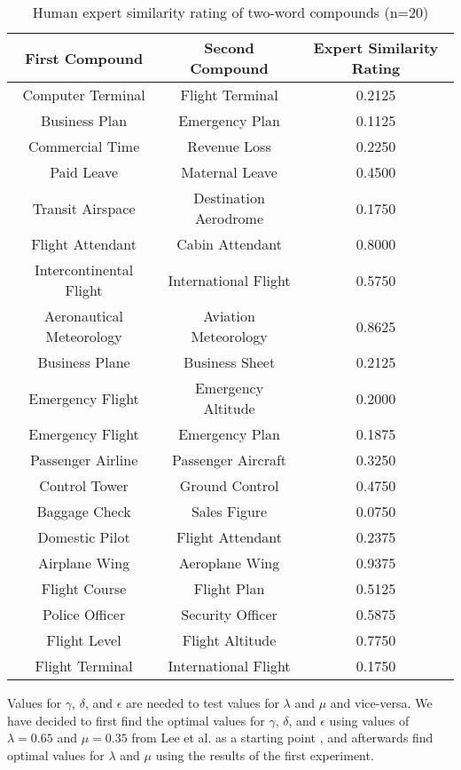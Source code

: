 \documentclass{article}
\begin{document}
\begin{table}[h!]
\centering
\begin{tabular}{|c|c||c|}
	\hline
	First Compound & Second Compound & Expert Similarity Rating \\
	\hline
	Computer Terminal & Flight Terminal & 0.2125 \\
	Business Plan & Emergency Plan & 0.1125 \\
	Commercial Time & Revenue Loss & 0.2250 \\
	Paid Leave & Maternal Leave & 0.4500 \\
	Transit Airspace & Destination Aerodrome & 0.1750 \\
	Flight Attendant & Cabin Attendant & 0.8000 \\
	Intercontinental Flight & International Flight & 0.5750 \\
	Aeronautical Meteorology & Aviation Meteorology & 0.8625 \\
	Business Plane & Business Sheet & 0.2125 \\
	Emergency Flight & Emergency Altitude & 0.2000 \\
	Emergency Flight & Emergency Plan & 0.1875 \\
	Passenger Airline & Passenger Aircraft & 0.3250 \\
	Control Tower & Ground Control & 0.4750 \\
	Baggage Check & Sales Figure & 0.0750 \\
	Domestic Pilot & Flight Attendant & 0.2375 \\
	Airplane Wing & Aeroplane Wing & 0.9375 \\
	Flight Course & Flight Plan & 0.5125 \\
	Police Officer & Security Officer & 0.5875 \\
	Flight Level & Flight Altitude & 0.7750 \\
	Flight Terminal & International Flight & 0.1750 \\
	\hline
\end{tabular}
\caption{Human expert similarity rating of two-word compounds (n=20)}
\label{table:humancompoundsimilarity}
\end{table}

Values for $\gamma$, $\delta$, and $\epsilon$ are needed to test values for $\lambda$ and $\mu$ and vice-versa. We have decided to first find the optimal values for $\gamma$, $\delta$, and $\epsilon$ using values of $\lambda = 0.65$ and $\mu = 0.35$ from Lee et al. as a starting point \cite{lee2016combining}, and afterwards find optimal values for $\lambda$ and $\mu$ using the results of the first experiment.
\end{document}

